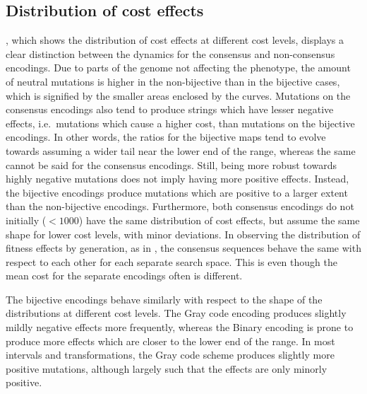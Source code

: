 \documentclass[a4paper,12pt]{article}
\theoremstyle{plain}
\theoremstyle{definition}
\begin{document}
   \subsection{Distribution of cost effects}
      , which shows the distribution of cost effects
      at different cost levels, displays a clear distinction between the
      dynamics for the consensus and non-consensus 
      encodings. Due to parts of the genome not affecting the phenotype, 
      the amount of neutral mutations is higher in the non-bijective than in the 
      bijective cases, which is signified by the smaller areas enclosed by the
      curves. 
      Mutations on the consensus encodings also tend 
      to produce strings which have lesser negative effects, i.e.\ mutations
      which cause a higher cost, than mutations on
      the bijective encodings. In other words, the ratios for the bijective
      maps tend to evolve towards assuming a wider tail near the lower end of
      the range, whereas the same cannot be said for the consensus encodings. 
      Still, being more robust towards highly negative mutations does not imply
      having more positive effects. Instead, the bijective encodings 
      produce mutations which are positive to a larger extent than the
      non-bijective encodings. Furthermore, both consensus encodings do not 
      initially ($< 1000$) have the same distribution of cost effects, but 
      assume the same shape for lower cost levels, with minor deviations. 
      In observing the distribution of fitness effects by generation, as in
      , the consensus sequences behave
      the same with respect to each other for each separate search space. This
      is even though the mean cost for the separate encodings often is
      different. 

      The bijective encodings behave similarly with respect to the shape of the
      distributions at different cost levels. The Gray code encoding produces
      slightly mildly negative effects more frequently, whereas the Binary encoding is 
      prone to produce more effects which are closer to the lower end of the range.  
      In most intervals and transformations, the Gray code scheme produces
      slightly more positive mutations, although largely such that the effects
      are only minorly positive. 
\end{document}
